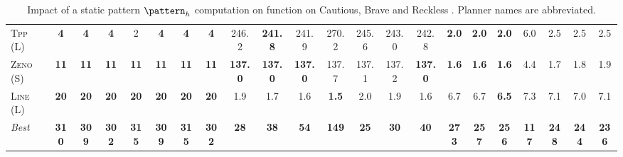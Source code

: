 \documentclass[11pt,landscape]{article}
\begin{document}
\begin{table}[tb]
{\begin{tabular}{|l||ccccccc||ccccccc||ccccccc||}
\textsc{Tpp} (L)&\textbf{4}&\textbf{4}&\textbf{4}&2&\textbf{4}&\textbf{4}&\textbf{4}&246.2&\textbf{241.8}&241.9&270.2&245.6&243.0&242.8&\textbf{2.0}&\textbf{2.0}&\textbf{2.0}&6.0&2.5&2.5&2.5\\
\textsc{Zeno} (S)&\textbf{11}&\textbf{11}&\textbf{11}&\textbf{11}&\textbf{11}&\textbf{11}&\textbf{11}&\textbf{137.0}&\textbf{137.0}&\textbf{137.0}&137.7&137.1&137.2&\textbf{137.0}&\textbf{1.6}&\textbf{1.6}&\textbf{1.6}&4.4&1.7&1.8&1.9\\
\textsc{Line} (L)&\textbf{20}&\textbf{20}&\textbf{20}&\textbf{20}&\textbf{20}&\textbf{20}&\textbf{20}&1.9&1.7&1.6&\textbf{1.5}&2.0&1.9&1.6&6.7&6.7&\textbf{6.5}&7.3&7.1&7.0&7.1
\\\hline
\textit{Best}&\textbf{310}&\textbf{309}&\textbf{302}&\textbf{315}&\textbf{309}&\textbf{315}&\textbf{302}&\textbf{28}&\textbf{38}&\textbf{54}&\textbf{149}&\textbf{25}&\textbf{30}&\textbf{40}&\textbf{273}&\textbf{257}&\textbf{256}&\textbf{117}&\textbf{248}&\textbf{244}&\textbf{236}\\\hline

        \end{tabular}}
        \caption{Impact of a static pattern $\pattern_h$ computation on function on Cautious, Brave and Reckless \pattyd. Planner names are abbreviated.}
        \label{tab:abl-patternh-static}
        \end{table}
        
\end{document}
